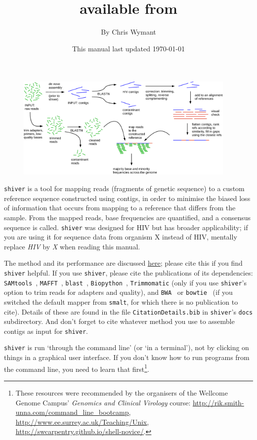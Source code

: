 \documentclass{article}
\title{\shiv\\available from \href{https://github.com/ChrisHIV/shiver}{\www{https://github.com/ChrisHIV/shiver}}}
\date{This manual last updated \today}
\author{By Chris Wymant}
\newcommand{\shiv}{\c{shiver}\xspace}
\let\c\texttt
\newcommand{\www}{\color{blue} \underline}
\begin{document}
\maketitle


\begin{figure}[!h]
\centering
\includegraphics[width=0.95\textwidth]{AssemblyPipelineDiagram_ForPaper.pdf}
\end{figure}


\shiv is a tool for mapping reads (fragments of genetic sequence) to a custom reference sequence constructed using contigs, in order to minimise the biased loss of information that occurs from mapping to a reference that differs from the sample.
From the mapped reads, base frequencies are quantified, and a consensus sequence is called.
\shiv was designed for HIV but has broader applicability; if you are using it for sequence data from organism X instead of HIV, mentally replace {\it HIV} by {\it X} when reading this manual.

The method and its performance are discussed \href{https://doi.org/10.1093/ve/vey007}{\www{here}}; please cite this if you find \shiv helpful.
If you use \shiv, please cite the publications of its dependencies: \c{SAMtools}~\cite{Li08062009}, \c{MAFFT}~\cite{Katoh15072002}, \c{blast}~\cite{ALTSCHUL1990403}, \c{Biopython}~\cite{biopython}, \c{Trimmomatic}\cite{Bolger01082014} (only if you use \shiv's option to trim reads for adapters and quality), and \c{BWA}~\cite{doi:10.1093/bioinformatics/btp698} or \c{bowtie}~\cite{Langmead2009} (if you switched the default mapper from \c{smalt}, for which there is no publication to cite).
Details of these are found in the file \c{CitationDetails.bib} in \shiv's \c{docs} subdirectory.
And don't forget to cite whatever method you use to assemble contigs as input for \shiv.

\shiv is run `through the command line' (or `in a terminal'), not by clicking on things in a graphical user interface.
If you don't know how to run programs from the command line, you need to learn that first\footnote{These resources were recommended by the organisers of the Wellcome Genome Campus' {\it Genomics and Clinical Virology} course: \href{http://rik.smith-unna.com/command_line_bootcamp}{\www{http://rik.smith-unna.com/command\_line\_bootcamp}},\\
\href{http://www.ee.surrey.ac.uk/Teaching/Unix}{\www{http://www.ee.surrey.ac.uk/Teaching/Unix}},\\
\href{http://swcarpentry.github.io/shell-novice/}{\www{http://swcarpentry.github.io/shell-novice/}}.}.
\end{document}
